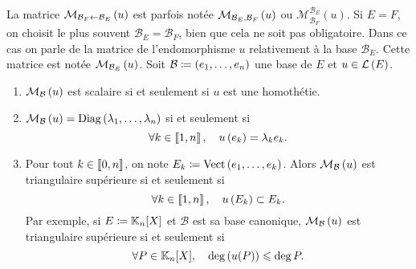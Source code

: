 \documentclass{magnolia}
\begin{document}
\begin{remarques}
\remarque La matrice $\mathcal{M}_{\mathcal{B}_F\gets\mathcal{B}_E}\left(u\right)$ est parfois notée
  $\mathcal{M}_{\mathcal{B}_E,\mathcal{B}_F}\left(u\right)$ ou
  $\mathcal{M}_{\mathcal{B}_F}^{\mathcal{B}_E}(u)$.
\remarque Si $E=F$, on choisit le plus souvent $\mathcal{B}_E=\mathcal{B}_F$, bien
  que cela ne soit pas obligatoire. Dans ce cas on parle de la matrice de
  l'endomorphisme $u$ relativement à la base $\mathcal{B}_E$. Cette matrice
  est notée $\mathcal{M}_{\mathcal{B}_E}\left(u\right)$.
\exo Soit $\mathcal{B}\coloneqq(e_1,\ldots,e_n)$ une base de $E$ et $u\in\mathcal{L}\left(E\right)$.
  \begin{enumerate}
  \item $\mathcal{M}_{\mathcal{B}}\left(u\right)$ est scalaire si et seulement si $u$ est une
    homothétie.
  \item $\mathcal{M}_{\mathcal{B}}\left(u\right)=\mathop{\rm{Diag}}\left(\lambda_1,\ldots,\lambda_n\right)$ si et
    seulement si
    \[\forall k\in\left\llbracket 1,n\right\rrbracket ,\quad u\left(e_k\right)=\lambda_k e_k.\]
  \item Pour tout $k\in\left\llbracket 0,n\right\rrbracket$, on note $E_k\coloneqq\operatorname{Vect}\left(e_1,\ldots,e_k\right)$.
    Alors $\mathcal{M}_{\mathcal{B}}\left(u\right)$ est triangulaire supérieure si et seulement si
    \[\forall k\in\left\llbracket 1,n\right\rrbracket ,\quad u\left(E_k\right)\subset E_k.\]
    Par exemple, si $E\defeq\polyK[n]$ et $\mathcal{B}$ est sa base canonique,
    $\mathcal{M}_{\mathcal{B}}\left(u\right)$ est triangulaire supérieure si et seulement si
    \[\forall P\in\polyK[n] \qsep \deg\p{u(P)}\leq\deg P.\]
    

\end{enumerate}
\end{remarques}
\end{document}

